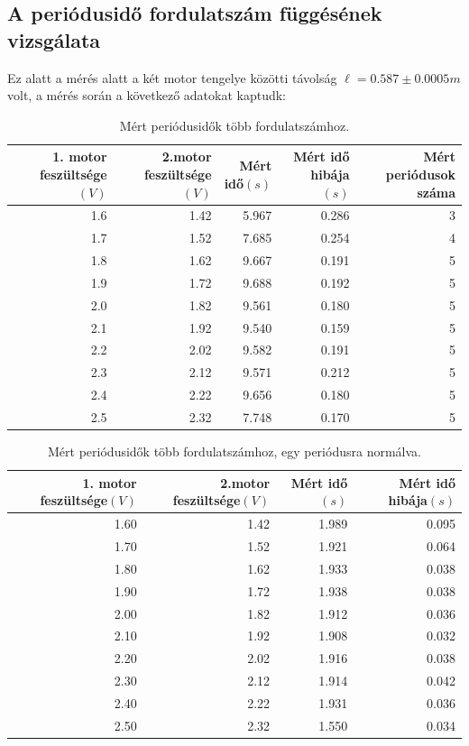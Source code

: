 \documentclass[10pt,pdftex]{report}
\begin{document}
\subsection*{A periódusidő fordulatszám függésének vizsgálata}
Ez alatt a mérés alatt a két motor tengelye közötti távolság $\ell=0.587\pm0.0005m$ volt, a mérés során a következő adatokat kaptudk:\\
\begin{table}[H]
    \begin{tabular}{|r|r|r|r|r|}
        \hline
        1. motor feszültsége$(V)$ & 2.motor feszültsége$(V)$ & Mért idő$(s)$ & Mért idő hibája$(s)$ & Mért periódusok száma \\
        \hline
        1.6 & 1.42 & 5.967 & 0.286 & 3 \\
        \hline
        1.7 & 1.52 & 7.685 & 0.254 & 4 \\
        \hline
        1.8 & 1.62 & 9.667 & 0.191 & 5 \\
        \hline
        1.9 & 1.72 & 9.688 & 0.192 & 5 \\
        \hline
        2.0 & 1.82 & 9.561 & 0.180 & 5 \\
        \hline
        2.1 & 1.92 & 9.540 & 0.159 & 5 \\
        \hline
        2.2 & 2.02 & 9.582 & 0.191 & 5 \\
        \hline
        2.3 & 2.12 & 9.571 & 0.212 & 5 \\
        \hline
        2.4 & 2.22 & 9.656 & 0.180 & 5 \\
        \hline
        2.5 & 2.32 & 7.748 & 0.170 & 5 \\
        \hline
    \end{tabular}
    \caption{Mért periódusidők több fordulatszámhoz.}
\end{table}
\begin{table}[H]
    \begin{tabular}{|r|r|r|r|}
        \hline
        1. motor feszültsége$(V)$ & 2.motor feszültsége$(V)$ & Mért idő$(s)$ & Mért idő hibája$(s)$ \\
        \hline
        1.60 & 1.42 & 1.989 & 0.095 \\
        \hline
        1.70 & 1.52 & 1.921 & 0.064 \\
        \hline
        1.80 & 1.62 & 1.933 & 0.038 \\
        \hline
        1.90 & 1.72 & 1.938 & 0.038 \\
        \hline
        2.00 & 1.82 & 1.912 & 0.036 \\
        \hline
        2.10 & 1.92 & 1.908 & 0.032 \\
        \hline
        2.20 & 2.02 & 1.916 & 0.038 \\
        \hline
        2.30 & 2.12 & 1.914 & 0.042 \\
        \hline
        2.40 & 2.22 & 1.931 & 0.036 \\
        \hline
        2.50 & 2.32 & 1.550 & 0.034 \\
        \hline
    \end{tabular}
    \caption{Mért periódusidők több fordulatszámhoz, egy periódusra normálva.}
\end{table}
\end{document}
